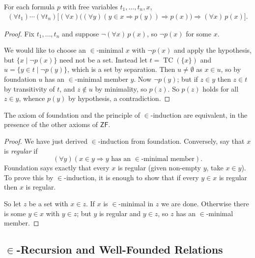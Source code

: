 \documentclass[a4paper]{scrartcl}
\newcommand{\TC}{\operatorname{TC}}
\newcommand{\ZF}{\mathsf{ZF}}
\begin{document}
\begin{theorem}\label{thm:epsiloninduction}
  For each formula $p$ with free variables $t_1, \dots, t_n, x$,
  \begin{align*}
  \left(\forall t_1\right) \cdots\left(\forall t_n\right)\bigl[(\forall x)\bigl((\forall y)(y \in x \Rightarrow p(y)) \Rightarrow p(x)\bigr) \Rightarrow(\forall x)\,p(x)\bigr].
  \end{align*}
\end{theorem}
\begin{proof}
  Fix $t_1, \dots, t_n$ and suppose $\lnot(\forall x)\,p(x)$, so $\lnot p(x)$ for some $x$.

  We would like to choose an $\in$-minimal $x$ with $\lnot p(x)$ and apply the hypothesis, but $\{x \mid \lnot p(x)\}$ need not be a set. Instead let $t = \TC(\{x\})$ and $u = \{y \in t \mid \lnot p(y)\}$, which is a set by separation. Then $u \neq \emptyset$ as $x \in u$, so by foundation $u$ has an $\in$-minimal member $y$. Now $\lnot p(y)$; but if $z \in y$ then $z \in t$ by transitivity of $t$, and $z \notin u$ by minimality, so $p(z)$. So $p(z)$ holds for all $z \in y$, whence $p(y)$ by hypothesis, a contradiction.
\end{proof}

\begin{theorem}
  The axiom of foundation and the principle of $\in$-induction are equivalent, in the presence of the other axioms of $\ZF$.
\end{theorem}
\begin{proof}
  We have just derived $\in$-induction from foundation. Conversely, say that $x$ is \emph{regular} if
  $$(\forall y)(x \in y \Rightarrow y \text{ has an } \in\text{-minimal member}).$$
  Foundation says exactly that every $x$ is regular (given non-empty $y$, take $x \in y$). To prove this by $\in$-induction, it is enough to show that if every $y \in x$ is regular then $x$ is regular.

  So let $z$ be a set with $x \in z$. If $x$ is $\in$-minimal in $z$ we are done. Otherwise there is some $y \in x$ with $y \in z$; but $y$ is regular and $y \in z$, so $z$ has an $\in$-minimal member.
\end{proof}

\subsection{\texorpdfstring{$\in$}{Epsilon}-Recursion and Well-Founded Relations}
\end{document}
